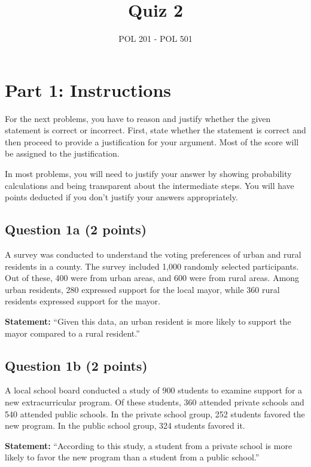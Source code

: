 \documentclass{article}
\title{Quiz 2}
\author{POL 201 - POL 501}
\date{}
\begin{document}
\maketitle

\section*{Part 1: Instructions}

For the next problems, you have to reason and justify whether the given statement is correct or incorrect. First, state whether the statement is correct and then proceed to provide a  justification for your argument. Most of the score will be assigned to the justification.

In most problems, you will need to justify your answer by showing probability calculations and being transparent about the intermediate steps. You will have points deducted if you don't justify your answers appropriately.

\subsection*{Question 1a (2 points)}

A survey was conducted to understand the voting preferences of urban and rural residents in a county. The survey included 1,000 randomly selected participants. Out of these, 400 were from urban areas, and 600 were from rural areas. Among urban residents, 280 expressed support for the local mayor, while 360 rural residents expressed support for the mayor.

\textbf{Statement:} ``Given this data, an urban resident is more likely to support the mayor compared to a rural resident.''

\subsection*{Question 1b (2 points)}

A local school board conducted a study of 900 students to examine support for a new extracurricular program. Of these students, 360 attended private schools and 540 attended public schools. In the private school group, 252 students favored the new program. In the public school group, 324 students favored it.

\textbf{Statement:} “According to this study, a student from a private school is more likely to favor the new program than a student from a public school.”
\end{document}
